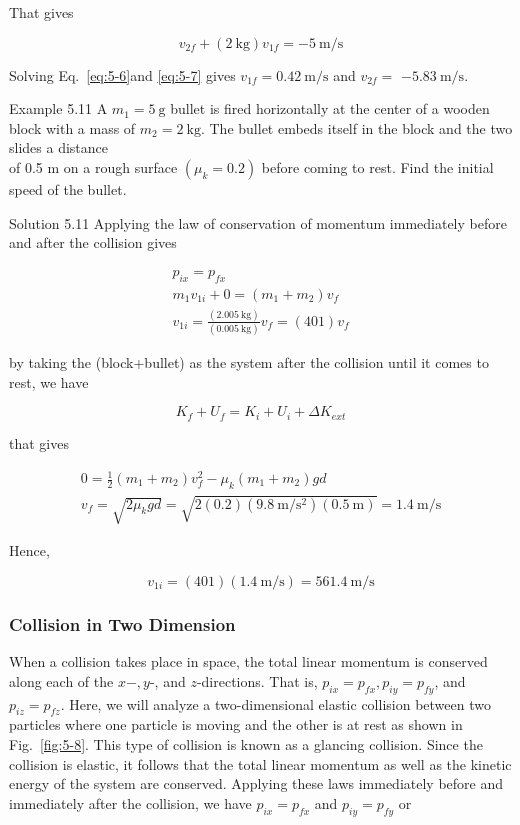 \documentclass[10pt]{article}
\numberwithin{equation}{section}
\begin{document}
That gives


\begin{equation}
v_{2 f}+(2 \mathrm{~kg}) v_{1 f}=-5 \mathrm{~m} / \mathrm{s} \label{eq:5-7}
\end{equation}


Solving Eq.~\eqref{eq:5-6}and \eqref{eq:5-7} gives $v_{1 f}=0.42 \mathrm{~m} / \mathrm{s}$ and $v_{2 f}=$ $-5.83 \mathrm{~m} / \mathrm{s}$.

Example 5.11 A $m_{1}=5 \mathrm{~g}$ bullet is fired horizontally at the center of a wooden block with a mass of $m_{2}=2 \mathrm{~kg}$. The bullet embeds itself in the block and the two slides a distance\\
of 0.5 m on a rough surface $\left(\mu_{k}=0.2\right)$ before coming to rest. Find the initial speed of the bullet.

Solution 5.11 Applying the law of conservation of momentum immediately before and after the collision gives

$$
\begin{gathered}
p_{i x}=p_{f x} \\
m_{1} v_{1 i}+0=\left(m_{1}+m_{2}\right) v_{f} \\
v_{1 i}=\frac{(2.005 \mathrm{~kg})}{(0.005 \mathrm{~kg})} v_{f}=(401) v_{f}
\end{gathered}
$$

by taking the (block+bullet) as the system after the collision until it comes to rest, we have

$$
K_{f}+U_{f}=K_{i}+U_{i}+\Delta K_{e x t}
$$

that gives

$$
\begin{gathered}
0=\frac{1}{2}\left(m_{1}+m_{2}\right) v_{f}^{2}-\mu_{k}\left(m_{1}+m_{2}\right) g d \\
v_{f}=\sqrt{2 \mu_{k} g d}=\sqrt{2(0.2)\left(9.8 \mathrm{~m} / \mathrm{s}^{2}\right)(0.5 \mathrm{~m})}=1.4 \mathrm{~m} / \mathrm{s}
\end{gathered}
$$

Hence,

$$
v_{1 i}=(401)(1.4 \mathrm{~m} / \mathrm{s})=561.4 \mathrm{~m} / \mathrm{s}
$$

\subsubsection{Collision in Two Dimension}\label{sec:5-4-6}
When a collision takes place in space, the total linear momentum is conserved along each of the $x-, y$-, and $z$-directions. That is, $p_{i x}=p_{f x}, p_{i y}=p_{f y}$, and $p_{i z}=p_{f z}$. Here, we will analyze a two-dimensional elastic collision between two particles where one particle is moving and the other is at rest as shown in Fig.~\ref{fig:5-8}. This type of collision is known as a glancing collision. Since the collision is elastic, it follows that the total linear momentum as well as the kinetic energy of the system are conserved. Applying these laws immediately before and immediately after the collision, we have $p_{i x}=p_{f x}$ and $p_{i y}=p_{f y}$ or
\end{document}
